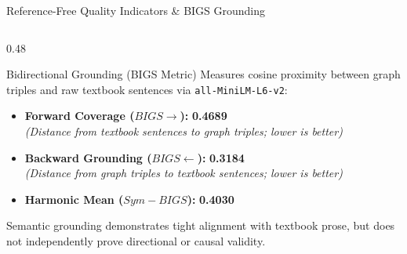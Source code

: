 \documentclass[aspectratio=169,10pt]{beamer}
\begin{document}
\begin{frame}{Reference-Free Quality Indicators \& BIGS Grounding}
\begin{columns}[T]
        \begin{column}{0.48\textwidth}
            \begin{exampleblock}{Bidirectional Grounding (BIGS Metric)}
                \footnotesize
                Measures cosine proximity between graph triples and raw textbook sentences via \texttt{all-MiniLM-L6-v2}:
                \begin{itemize}
                    \item \textbf{Forward Coverage ($BIGS \to$):} \textbf{0.4689}\\
                    \textit{(Distance from textbook sentences to graph triples; lower is better)}
                    \item \textbf{Backward Grounding ($BIGS \leftarrow$):} \textbf{0.3184}\\
                    \textit{(Distance from graph triples to textbook sentences; lower is better)}
                    \item \textbf{Harmonic Mean ($Sym-BIGS$):} \textbf{0.4030}
                \end{itemize}
            \end{exampleblock}

            \begin{tcolorbox}[colback=lightgraybg,colframe=primaryblue,title=\textbf{Methodological Caveat},sharp corners]
                \tiny Semantic grounding demonstrates tight alignment with textbook prose, but does not independently prove directional or causal validity.
            \end{tcolorbox}
        \end{column}
    \end{columns}
\end{frame}
\end{document}
